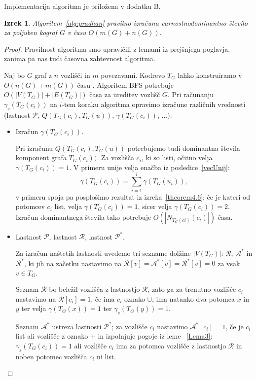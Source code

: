 \documentclass[12pt,a4paper,twoside]{article}
\theoremstyle{definition} %
\theoremstyle{plain} %
\newtheorem{izrek}[definicija]{Izrek}
\numberwithin{equation}{section}  %
\begin{document}
Implementacija algoritma je priložena v dodatku B.
\begin{izrek} Algoritem~\ref{alg:pradhan} pravilno izračuna varnostnodominantno število za poljuben kograf $G$ v času $O(m(G) + n(G))$.
\end{izrek}
\begin{proof}
Pravilnost algoritma smo upravičili z lemami iz prejšnjega poglavja, zanima pa nas tudi časovna zahtevnost algoritma.

Naj bo $G$ graf z $n$ vozlišči in $m$ povezavami. Kodrevo $T_G$ lahko konstruiramo v $O(n(G)+m(G))$ času \cite{corneil1985linear}. Algoritem BFS potrebuje $O(|V(T_G)| + |E(T_G)|)$ časa za ureditev vozlišč $G$. Pri računanju $\gamma_s(T_G(c_i))$ na $i$-tem koraku algoritma opravimo izračune različnih vrednosti (lastnost $\mathcal{P}$, $Q(T_G(c_i), T_G(u))$, $\gamma(T_G(c_i))$, ...):
\begin{itemize}
\item Izračun $\gamma(T_G(c_i))$.

Pri izračunu $Q(T_G(c_i), T_G(u))$ potrebujemo tudi dominantna števila komponent grafa $T_G(c_i))$. Za vozlišča $c_i$, ki so listi, očitno velja $\gamma(T_G(c_i)) = 1$. V primeru unije velja enačba iz  posledice~\ref{vecUnij}: $$\gamma(T_G(c_i)) = \sum\limits_{i=1}^l \gamma(T_G(u_i)),$$v primeru spoja pa posplošimo rezultat iz izreka~\ref{theorem4.6}; če je kateri od potomcev $c_i$ list, velja $\gamma(T_G(c_i)) = 1$, sicer velja $\gamma(T_G(c_i)) = 2$. Izračun dominantnega števila tako potrebuje $O(|N_{T_G(ci)}(c_i)|)$ časa.

\item Lastnost $\mathcal{P}$, lastnost $\mathcal{R}$, lastnost $\mathcal{P^*}$.

Za izračun naštetih lastnosti uvedemo tri sezname dolžine $|V(T_G)|$: $\mathcal{R}$, $\mathcal{A^*}$ in $\mathcal{R^*}$, ki jih na začetku nastavimo na $\mathcal{R}[v]=\mathcal{A^*}[v]=\mathcal{R^*}[v]=0$ za vsak $v\in T_G$.

Seznam $\mathcal{R}$ bo beležil vozlišča z lastnostjo $\mathcal{R}$, zato ga za trenutno vozlišče $c_i$ nastavimo na $\mathcal{R}[{c_i}]=1$, če ima $c_i$ oznako $\cup$, ima natanko dva potomca $x$ in $y$ ter velja $\gamma(T_G(x)) = 1$ ter $\gamma_s(T_G(y)) = 1$.

Seznam $\mathcal{A^*}$ ustreza lastnosti $\mathcal{P^*}$; za vozlišče $c_i$ nastavimo $\mathcal{A}^*[{c_i}]=1$, če je $c_i$ list ali vozlišče z oznako $+$ in izpolnjuje pogoje iz leme ~\ref{Lema3}: $\gamma_s(T_G(c_i)) = 1$ ali vozlišče $c_i$ ima za potomca vozlišče z lastnostjo $\mathcal{R}$ in noben potomec vozlišča $c_i$ ni list.


\end{itemize}
\end{proof}
\end{document}

